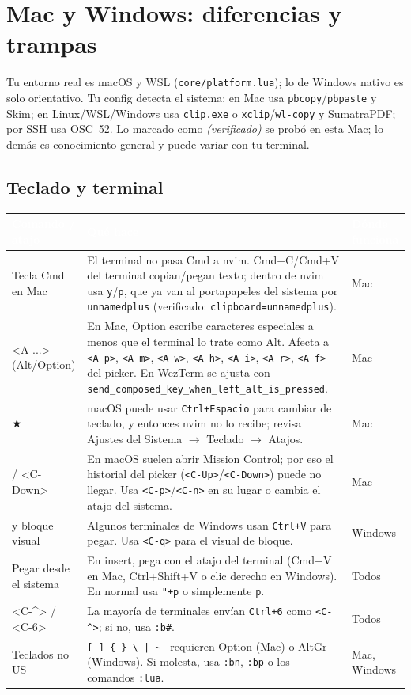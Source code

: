 \documentclass[8pt,a4paper,landscape]{extarticle}
\newcommand{\kk}[1]{\texttt{#1}}
\newcommand{\bs}{\textbackslash{}}
\newcommand{\tl}{\textasciitilde{}}
\newcommand{\ca}{\textasciicircum{}}
\newcommand{\bt}{\textasciigrave{}}
\newcommand{\mk}{\textcolor{mine}{$\bigstar$}}   %
\newenvironment{cht}{%
  \begin{longtable}{>{\raggedright\arraybackslash\ttfamily}p{0.27\textwidth}
                    >{\raggedright\arraybackslash}p{0.46\textwidth}
                    >{\raggedright\arraybackslash}p{0.21\textwidth}}
  \rowcolor{accent}\textcolor{white}{\textbf{\rmfamily Comando / atajo}} &
  \textcolor{white}{\textbf{Qué hace}} & \textcolor{white}{\textbf{Dónde funciona}} \\
  \endhead
}{\end{longtable}}
\newcommand{\rr}[3]{#1 & #2 & #3 \\}
\newcommand{\rg}[3]{\rowcolor{rowgray}\relax #1 & #2 & #3 \\}
\let\oldsubsection\subsection
\renewcommand{\subsection}{\Needspace{9\baselineskip}\oldsubsection}
\let\oldsection\section
\renewcommand{\section}{\Needspace{10\baselineskip}\oldsection}
\begin{document}
\section{Mac y Windows: diferencias y trampas}
Tu entorno real es macOS y WSL (\kk{core/platform.lua}); lo de Windows nativo es solo orientativo. Tu config detecta el sistema: en Mac usa \kk{pbcopy}/\kk{pbpaste} y Skim; en Linux/WSL/Windows usa \kk{clip.exe} o \kk{xclip}/\kk{wl-copy} y SumatraPDF; por SSH usa OSC~52. Lo marcado como \emph{(verificado)} se probó en esta Mac; lo demás es conocimiento general y puede variar con tu terminal.

\subsection{Teclado y terminal}
\begin{cht}
\rg{Tecla Cmd en Mac}{El terminal no pasa Cmd a nvim. Cmd+C/Cmd+V del terminal copian/pegan texto; dentro de nvim usa \kk{y}/\kk{p}, que ya van al portapapeles del sistema por \kk{unnamedplus} (verificado: \kk{clipboard=unnamedplus}).}{Mac}
\rr{<A-...> (Alt/Option)}{En Mac, Option escribe caracteres especiales a menos que el terminal lo trate como Alt. Afecta a \kk{<A-p>}, \kk{<A-m>}, \kk{<A-w>}, \kk{<A-h>}, \kk{<A-i>}, \kk{<A-r>}, \kk{<A-f>} del picker. En WezTerm se ajusta con \kk{send\_composed\_key\_when\_left\_alt\_is\_pressed}.}{Mac}
\rg{<C-Space> \mk}{macOS puede usar \kk{Ctrl+Espacio} para cambiar de teclado, y entonces nvim no lo recibe; revisa Ajustes del Sistema $\to$ Teclado $\to$ Atajos.}{Mac}
\rr{<C-Up> / <C-Down>}{En macOS suelen abrir Mission Control; por eso el historial del picker (\kk{<C-Up>}/\kk{<C-Down>}) puede no llegar. Usa \kk{<C-p>}/\kk{<C-n>} en su lugar o cambia el atajo del sistema.}{Mac}
\rg{<C-v> y bloque visual}{Algunos terminales de Windows usan \kk{Ctrl+V} para pegar. Usa \kk{<C-q>} para el visual de bloque.}{Windows}
\rr{Pegar desde el sistema}{En insert, pega con el atajo del terminal (Cmd+V en Mac, Ctrl+Shift+V o clic derecho en Windows). En normal usa \kk{"+p} o simplemente \kk{p}.}{Todos}
\rg{<C-\ca{}> / <C-6>}{La mayoría de terminales envían \kk{Ctrl+6} como \kk{<C-\ca{}>}; si no, usa \kk{:b\#}.}{Todos}
\rr{Teclados no US}{\kk{[ ] \{ \} \bs\ | \tl\ \bt} requieren Option (Mac) o AltGr (Windows). Si molesta, usa \kk{:bn}, \kk{:bp} o los comandos \kk{:lua}.}{Mac, Windows}
\end{cht}
\end{document}
